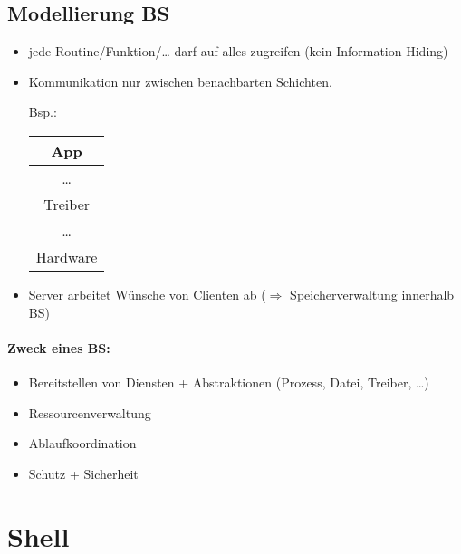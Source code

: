 \subsection{Modellierung BS}
\begin{itemize}
\item {} jede Routine/Funktion/… darf auf alles zugreifen (kein Information Hiding)
\item {} Kommunikation nur zwischen benachbarten Schichten.

Bsp.: \begin{tabular}{|c|}
\hline
App\\
\hline
…\\
\hline
Treiber\\
\hline
…\\
\hline
Hardware\\
\hline
\end{tabular}
\item {} Server arbeitet Wünsche von Clienten ab ($\Rightarrow$ Speicherverwaltung innerhalb BS)
\end{itemize}


\paragraph{Zweck eines BS:}
\begin{itemize}
\item Bereitstellen von Diensten + Abstraktionen (Prozess, Datei, Treiber, …)
\item Ressourcenverwaltung
\item Ablaufkoordination
\item Schutz + Sicherheit
\end{itemize}

\section{Shell}

